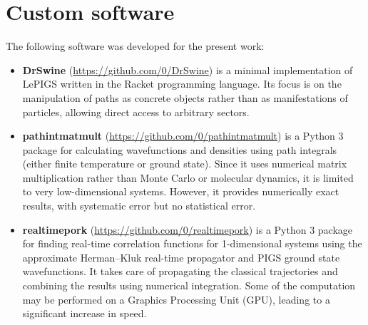 \chapter{Custom software}

The following software was developed for the present work:

\begin{itemize}[itemsep=2 mm]
	\item \textbf{DrSwine} (\url{https://github.com/0/DrSwine}) is a minimal implementation of LePIGS written in the Racket programming language.
		Its focus is on the manipulation of paths as concrete objects rather than as manifestations of particles, allowing direct access to arbitrary sectors.
	\item \textbf{pathintmatmult} (\url{https://github.com/0/pathintmatmult}) is a Python 3 package for calculating wavefunctions and densities using path integrals (either finite temperature or ground state).
		Since it uses numerical matrix multiplication rather than Monte Carlo or molecular dynamics, it is limited to very low-dimensional systems.
		However, it provides numerically exact results, with systematic error but no statistical error.
	\item \textbf{realtimepork} (\url{https://github.com/0/realtimepork}) is a Python 3 package for finding real-time correlation functions for 1-dimensional systems using the approximate Herman--Kluk real-time propagator and PIGS ground state wavefunctions.
		It takes care of propagating the classical trajectories and combining the results using numerical integration.
		Some of the computation may be performed on a Graphics Processing Unit (GPU), leading to a significant increase in speed.
\end{itemize}
